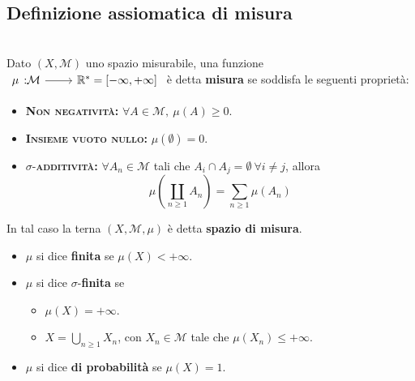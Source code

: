 \subsection{Definizione assiomatica di misura}
\begin{define}~{}\\
	Dato $\left(X,\mathcal{M}\right)$ uno spazio misurabile, una funzione $\funz{\mu}{\mathcal{M}}{\realset^{\ast}=\left[-\infty,+\infty\right]}$ è detta \textbf{misura} se soddisfa le seguenti proprietà:
	\begin{itemize}
		\item \textsc{\textbf{Non negatività:}} $\forall A\in\mathcal{M},\ \mu\left(A\right)\geq 0$.
		\item \textsc{\textbf{Insieme vuoto nullo:}} $\mu\left(\emptyset\right)=0$.
		\item $\sigma$-\textsc{\textbf{additività:}} $\forall A_n\in\mathcal{M}$ tali che $A_i\cap A_j=\emptyset\ \forall i\neq j$, allora
		\begin{equation}
			\mu\left(\coprod_{n\geq 1}A_n\right)=\sum_{n\geq 1}\mu\left(A_n\right)
		\end{equation}
	\end{itemize}
	In tal caso la terna $\left(X,\mathcal{M},\mu\right)$ è detta \textbf{spazio di misura}.
	\begin{itemize}
		\item $\mu$ si dice \textbf{finita} se $\mu\left(X\right)<+\infty$.
		\item $\mu$ si dice $\sigma$-\textbf{finita} se
		\begin{itemize}
			\item $\mu\left(X\right)=+\infty$.
			\item $\displaystyle X=\bigcup_{n\geq 1}X_n$, con $X_n\in\mathcal{M}$ tale che $\mu\left(X_n\right)\leq +\infty$.
		\end{itemize}
	\item $\mu$ si dice \textbf{di probabilità} se $\mu\left(X\right)=1$.
	\end{itemize}
\end{define}

